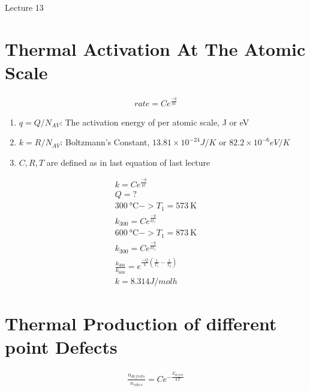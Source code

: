 \documentclass{article}
\begin{document}
\Huge
Lecture 13

\normalsize


\section{Thermal Activation At The Atomic Scale}

\begin{equation}
    \begin{split}
        \textit{rate} = C e^{\frac{-q}{kt}}
    \end{split}
\end{equation}

\begin{enumerate}
    \item $q=Q/N_{AV}$: The activation energy of per atomic scale, J or eV
    \item $k = R/N_{AV}$: Boltzmann's Constant, $13.81 \times 10^{-24}J/K$ or $82.2 \times 10^{-6}eV/K$
    \item $C, R, T$ are defined as in last equation of last lecture
\end{enumerate}


\begin{multline}
    k = C e^{\frac{-q}{kt}} \\
    Q = ? \\
    \SI{300}{\celsius} -> T_1 = \SI{573}{\kelvin} \\
    k_{300} = C e^{\frac{-q}{kt_1}} \\
    \SI{600}{\celsius} -> T_1 = \SI{873}{\kelvin} \\
    k_{300} = C e^{\frac{-q}{kt_1}} \\ 
    \frac{k_{300}}{k_{600}} = e^{\frac{-Q}{k}(\frac{1}{T_1} - \frac{1}{T_2})} \\
    k = 8.314 J/mol h
\end{multline}

\section{Thermal Production of different point Defects}

\begin{equation}
    \begin{split}
        \frac{n_\textit{defects}}{n_\textit{sites}} = C e^{-\frac{E_\textit{defect}}{kT}}
    \end{split}
\end{equation}
\end{document}

